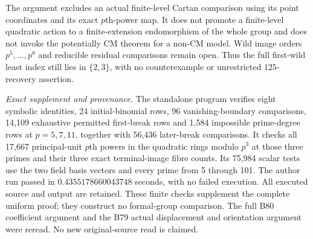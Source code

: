 \begin{remark}
\label{rem:B-RD81-scope}
The argument excludes an actual finite-level Cartan comparison
using its point coordinates and its exact \(p\)th-power map.
It does not promote a finite-level quadratic action to a
finite-extension endomorphism of the whole group and does
not invoke the potentially CM theorem for a non-CM model.
Wild image orders \(p^5,\ldots,p^8\) and reducible residual
comparisons remain open. Thus the full first-wild least
index still lies in \(\{2,3\}\), with no counterexample or
unrestricted \(125\)-recovery assertion.

\smallskip
\noindent\emph{Exact supplement and provenance.}
The standalone program
verifies eight symbolic identities, 24 initial-binomial rows,
96 vanishing-boundary comparisons, 14,109 exhaustive permitted
first-break rows and 1,584 impossible prime-degree rows at
\(p=5,7,11\), together with 56,436 later-break comparisons.
It checks all 17,667 principal-unit \(p\)th powers in the
quadratic rings modulo \(p^3\) at those three primes and
their three exact terminal-image fibre counts. Its 75,984
scalar tests use the two field basis vectors and every
prime from 5 through 101. The author run passed in
\(0.4355178660043748\) seconds, with no failed execution.
All executed source and output are retained. These finite
checks supplement the complete uniform proof; they construct
no formal-group comparison. The full B80 coefficient argument
and the B79 actual displacement and orientation argument were
reread. No new original-source read is claimed.
\end{remark}
